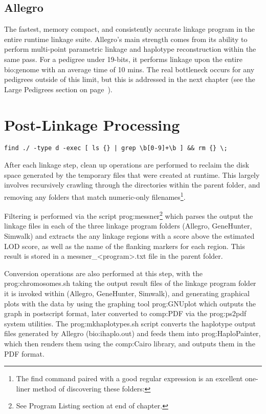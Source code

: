 \subsection{Allegro}

The fastest, memory compact, and consistently accurate linkage program in the entire runtime linkage suite. Allegro's main strength comes from its ability to perform multi-point parametric linkage and haplotype reconstruction within the same pass. For a pedigree under 19-bits, it performs linkage upon the entire \gls{bio:genome} with an average time of 10 mins. The real bottleneck occurs for any pedigrees outside of this limit, but this is addressed in the next chapter (see the Large Pedigrees section on page~\pageref{ref:meth:largepeds}).


\section{Post-Linkage Processing}

\begin{lrbox}\myVerb\scriptsize
\verb!find ./ -type d -exec [ ls {} | grep \b[0-9]+\b ] && rm {} \;!
\end{lrbox}%

After each linkage step, clean up operations are performed to reclaim the disk space generated by the temporary files that were created at runtime. This largely involves recursively crawling through the directories within the parent folder, and removing any folders that match numeric-only filenames\footnote{The find command paired with a good regular expression is an excellent one-liner method of discovering these folders: \usebox\myVerb}.

Filtering is performed via the script \gls{prog:messner}\footnote{See Program Listing section at end of chapter.} which parses the output the linkage files in each of the three linkage program folders (Allegro, GeneHunter, Simwalk) and extracts the any linkage regions with a score above the estimated LOD score, as well as the name of the flanking markers for each region. This result is stored in a messner\_<program>.txt file in the parent folder.

Conversion operations are also performed at this step, with the \gls{prog:chromosomes.sh} taking the output result files of the linkage program folder it is invoked within (Allegro, GeneHunter, Simwalk), and generating graphical plots with the data by using the graphing tool \gls{prog:GNUplot} which outputs the graph in postscript format, later converted to \gls{comp:PDF} via the \gls{prog:ps2pdf} system utilities. The \gls{prog:mkhaplotypes.sh} script converts the haplotype output files generated by Allegro (\gls{bio:ihaplo.out}) and feeds them into \gls{prog:HaploPainter}, which then renders them using the \gls{comp:Cairo} library, and outputs them in the PDF format.

